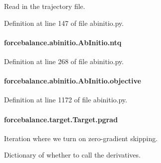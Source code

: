 Read in the trajectory file. 



Definition at line 147 of file abinitio.\-py.

\hypertarget{classforcebalance_1_1abinitio_1_1AbInitio_af8a895f61ddea6b9ca2765ddbf309a75}{
\paragraph[{ntq}]{\setlength{\rightskip}{0pt plus 5cm}forcebalance.\-abinitio.\-Ab\-Initio.\-ntq}}\label{classforcebalance_1_1abinitio_1_1AbInitio_af8a895f61ddea6b9ca2765ddbf309a75}


Definition at line 268 of file abinitio.\-py.

\hypertarget{classforcebalance_1_1abinitio_1_1AbInitio_acbbd447b9f66bc4699992f3b64bb256d}{
\paragraph[{objective}]{\setlength{\rightskip}{0pt plus 5cm}forcebalance.\-abinitio.\-Ab\-Initio.\-objective}}\label{classforcebalance_1_1abinitio_1_1AbInitio_acbbd447b9f66bc4699992f3b64bb256d}


Definition at line 1172 of file abinitio.\-py.

\hypertarget{classforcebalance_1_1target_1_1Target_a684235b4332b608c4e2da22982c2fdfa}{
\paragraph[{pgrad}]{\setlength{\rightskip}{0pt plus 5cm}forcebalance.\-target.\-Target.\-pgrad\hspace{0.3cm}{\ttfamily [inherited]}}}\label{classforcebalance_1_1target_1_1Target_a684235b4332b608c4e2da22982c2fdfa}


Iteration where we turn on zero-\/gradient skipping. 

Dictionary of whether to call the derivatives. 

